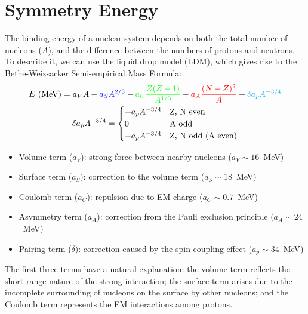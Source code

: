 \section{Symmetry Energy} 
The binding energy of a nuclear system depends on both the total number of nucleons ($A$),
and the difference between the numbers of protons and neutrons. To describe it,
we can use the liquid drop model (LDM), which gives rise to the Bethe-Weizsacker Semi-empirical Mass Formula:
\begin{equation}
    \begin{gathered}
	E\ (\mathrm{MeV}) = \textcolor{black}{a_V A} 
	    - \textcolor{blue}{a_S A^{2/3}} 
	    - \textcolor{green}{a_C\frac{Z(Z-1)}{A^{1/3}}} 
	    - \textcolor{red}{a_A\frac{(N-Z)^2}{A}} 
	    + \textcolor{cyan}{\delta a_p A^{-3/4}} \\
	\delta a_p A^{-3/4} = 
	    \begin{cases}
		+a_p A^{-3/4}	& \text{Z, N even} \\
		0		& \text{A odd}	\\
		-a_p A^{-3/4}	& \text{Z, N odd (A even)} \\
	    \end{cases}
    \end{gathered}
    \label{eq:mass-formula}
\end{equation}

\begin{itemize}
    \color{black} \item Volume term ($a_V$): strong force between nearby nucleons ($a_V \sim 16$~MeV)
    \color{blue}  \item Surface term ($a_S$): correction to the volume term ($a_S \sim 18$~MeV)
    \color{green} \item Coulomb term ($a_C$): repulsion due to EM charge ($a_C \sim 0.7$~MeV)
    \color{red}   \item Asymmetry term ($a_A$): correction from the Pauli exclusion principle ($a_A \sim 24$~MeV)
    \color{cyan}  \item Pairing term ($\delta$): correction caused by the spin coupling effect 
	($a_p \sim 34$~MeV)
\end{itemize}

The first three terms have a natural explanation:
the volume term reflects the short-range nature of the strong interaction; the
surface term arises due to the incomplete surrounding of nucleons on the surface 
by other nucleons; and the Coulomb term represents the EM interactions among protons. 

